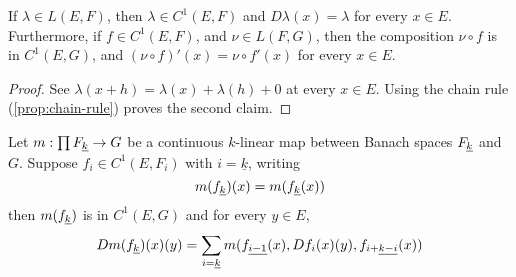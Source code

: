 \documentclass[../main-manifolds.tex]{subfiles}
\begin{document}
\begin{wts}\label{prop:differentiating-linear-maps}
    If $\lambda\in L(E,F)$, then $\lambda\in C^1(E,F)$ and $D\lambda(x) = \lambda$ for every $x\in E$. Furthermore, if $f\in C^1(E,F)$, and $\nu\in L(F,G)$, then the composition $\nu\circ f$ is in $C^1(E,G)$, and $(\nu\circ f)'(x) = \nu\circ f'(x)$ for every $x\in E$.
\end{wts}
\begin{proof}
    See $\lambda(x+h) = \lambda(x) + \lambda(h) + 0$ at every $x\in E$. Using the chain rule (\cref{prop:chain-rule}) proves the second claim.
\end{proof}
\begin{wts}\label{prop:product-rule-k-variables}
    Let $m: \prod \UL{F}[k]\to G$ be a continuous $k$-linear map between Banach spaces $\UL{F}[k]$ and $G$. Suppose $f_i\in C^1(E, F_i)$ with $i=\underline{k}$, writing 
    \begin{equation}\label{eq:k-linear-multiplication-map-def}
        m(\UL{f}[k])(x) = m(\UL{f}[k](x))
    \end{equation}
    then $m(\UL{f}[k])$ is in $C^1(E,G)$ and for every $y\in E$,
    \begin{equation}\label{eq:k-linear-product-rule}
        Dm(\UL{f}[k])(x)(y) = \sum_{i=\underline{k}}m(\UL{f}[i-1](x),Df_i(x)(y),\UL{f}[i+][k-i](x))
    \end{equation}
\end{wts}
\end{document}
